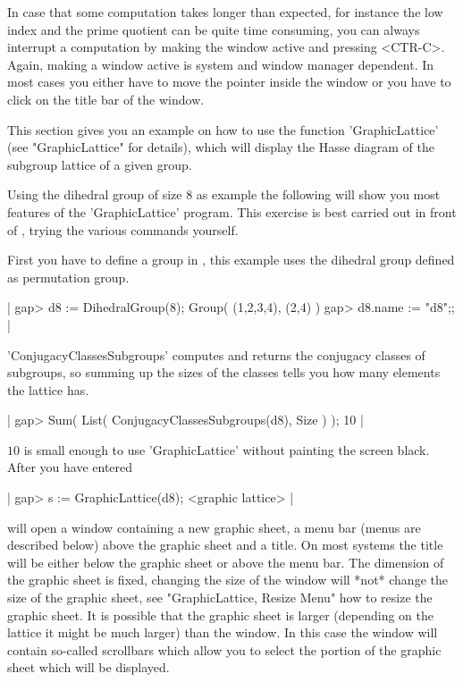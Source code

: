 In  case that some computation  takes  longer than expected, for instance
the low index and the prime quotient can be quite time consuming, you can
always interrupt  a computation  by  making the {\GAP}  window active and
pressing <CTR-C>.  Again, making  a  window active  is system and  window
manager dependent.   In most cases  you either have  to  move the pointer
inside  the {\GAP} window or you  have to click on the   title bar of the
{\GAP} window.


This  section   gives  you an   example    on how  to    use the function
'GraphicLattice' (see "GraphicLattice" for  details), which will  display
the Hasse diagram of the subgroup lattice of a given group.

Using the dihedral group of  size $8$ as  example the following will show
you most features of the 'GraphicLattice' program.  This exercise is best
carried out in front of {\XGAP}, trying the various commands yourself.

First  you   have to define a  group   in {\GAP},  this example  uses the
dihedral group defined as permutation group.

|    gap> d8 := DihedralGroup(8);
    Group( (1,2,3,4), (2,4) )
    gap> d8.name := "d8";; |

'ConjugacyClassesSubgroups' computes and returns the conjugacy classes of
subgroups, so summing  up the sizes  of the classes   tells you how  many
elements the lattice has.

|    gap> Sum( List( ConjugacyClassesSubgroups(d8), Size ) );
    10 |

$10$ is small enough to use  'GraphicLattice' without painting the screen
black.  After you have entered

|    gap> s := GraphicLattice(d8);
    <graphic lattice> |

{\XGAP} will  open a window containing  a  new graphic  sheet, a menu bar
(menus are described below) above the graphic sheet and a title.  On most
systems the  title will be  either below the  graphic sheet or  above the
menu bar.  The dimension of the graphic sheet is fixed, changing the size
of the window will   *not* change the size   of  the graphic sheet,   see
"GraphicLattice,  Resize Menu"  how to resize  the  graphic sheet.  It is
possible  that the graphic  sheet is larger (depending  on the lattice it
might be much larger) than  the  window.  In  this  case the window  will
contain so-called scrollbars which allow you to select the portion of the
graphic sheet which will be displayed.

